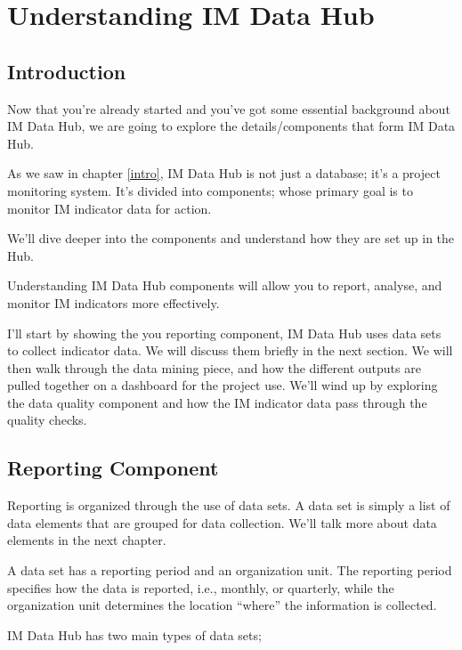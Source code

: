 \documentclass[]{book}
\begin{document}
\hypertarget{comp}{%
\chapter{Understanding IM Data Hub}\label{comp}}

\hypertarget{introduction}{%
\section{Introduction}\label{introduction}}

Now that you're already started and you've got some essential background about IM Data Hub, we are going to explore the details/components that form IM Data Hub.

As we saw in chapter \ref{intro}, IM Data Hub is not just a database; it's a project monitoring system. It's divided into components; whose primary goal is to monitor IM indicator data for action.

We'll dive deeper into the components and understand how they are set up in the Hub.

Understanding IM Data Hub components will allow you to report, analyse, and monitor IM indicators more effectively.

I'll start by showing the you reporting component, IM Data Hub uses data sets to collect indicator data. We will discuss them briefly in the next section. We will then walk through the data mining piece, and how the different outputs are pulled together on a dashboard for the project use. We'll wind up by exploring the data quality component and how the IM indicator data pass through the quality checks.

\hypertarget{reporting-component}{%
\section{Reporting Component}\label{reporting-component}}

Reporting is organized through the use of data sets. A data set is simply a list of data elements that are grouped for data collection. We'll talk more about data elements in the next chapter.

A data set has a reporting period and an organization unit. The reporting period specifies how the data is reported, i.e., monthly, or quarterly, while the organization unit determines the location ``where'' the information is collected.

IM Data Hub has two main types of data sets;
\end{document}
